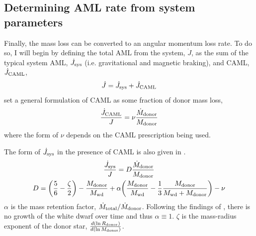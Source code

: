 

\subsection{Determining AML rate from system parameters}
\label{sect:modelling:getting AML rate from system parameters}

Finally, the mass loss can be converted to an angular momentum loss rate. To do so, I will begin by defining the total AML from the system, $\dot J$, as the sum of the typical system AML, $\dot J_{\rm sys}$ (i.e. gravitational and magnetic braking), and CAML, $\dot J_{\rm CAML}$,
\begin{equation}
    \dot J = \dot J_{\rm sys} + \dot J_{\rm CAML}
\end{equation}
\citet{king1995} set a general formulation of CAML as some fraction of donor mass loss,
\begin{equation}
    \frac{\dot J_{\rm CAML}}{J} = \nu \frac{\dot M_{\rm donor}}{M_{\rm donor}}
\end{equation}
where the form of $\nu$ depends on the CAML prescription being used.

The form of $\dot J_{\rm sys}$ in the presence of CAML is also given in \citet{king1995}.
\begin{gather}
    \frac{\dot J_{\rm sys}}{J} = D \frac{\dot M_{\rm donor}}{M_{\rm donor}} \\
    D = \bigg(\frac{5}{6} - \frac{\zeta}{2}\bigg) - \frac{M_{\rm donor}}{M_{\rm wd}} + \alpha \bigg( \frac{M_{\rm donor}}{M_{\rm wd}} - \frac{1}{3} \frac{M_{\rm donor}}{M_{\rm wd} + M_{\rm donor}} \bigg)  - \nu
\end{gather}
$\alpha$ is the mass retention factor, $\dot M_{\rm total} / \dot M_{\rm donor}$. Following the findings of \citet{McAllister2019}, there is no growth of the white dwarf over time and thus $\alpha \equiv 1$. $\zeta$ is the mass-radius exponent of the donor star, $\frac{d(\ln R_{\rm donor})}{d(\ln M_{\rm donor})}$.


